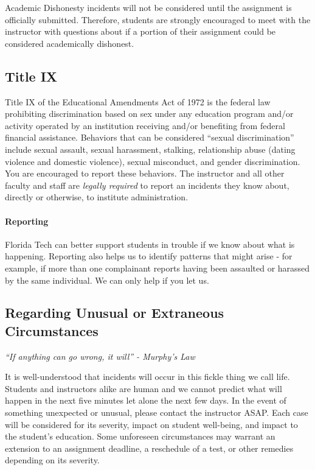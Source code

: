     Academic Dishonesty incidents will not be considered until the assignment is officially submitted. 
    Therefore, students are strongly encouraged to meet with the instructor with questions about if a portion of their assignment could be considered academically dishonest.

    \subsection*{Title IX}
    Title IX of the Educational Amendments Act of 1972 is the federal law prohibiting discrimination based on sex under any education program and/or activity operated by an institution receiving and/or benefiting from federal financial assistance. Behaviors that can be considered “sexual discrimination” include sexual assault, sexual harassment, stalking, relationship abuse (dating violence and domestic violence), sexual misconduct, and gender discrimination. You are encouraged to report these behaviors. The instructor and all other faculty and staff are \emph{legally required} to report an incidents they know about, directly or otherwise, to institute administration.

    \paragraph*{Reporting} Florida Tech can better support students in trouble if we know about what is happening.  Reporting also helps us to identify patterns that might arise - for example, if more than one complainant reports having been assaulted or harassed by the same individual. We can only help if you let us.

    \subsection*{Regarding Unusual or Extraneous Circumstances}
    \emph{``If anything can go wrong, it will'' - Murphy's Law}

    It is well-understood that incidents will occur in this fickle thing we call life.
    Students and instructors alike are human and we cannot predict what will happen in the next five minutes let alone the next few days.
    In the event of something unexpected or unusual, please contact the instructor ASAP.
    Each case will be considered for its severity, impact on student well-being, and impact to the student's education.
    Some unforeseen circumstances may warrant an extension to an assignment deadline, a reschedule of a test, or other remedies depending on its severity.
    
